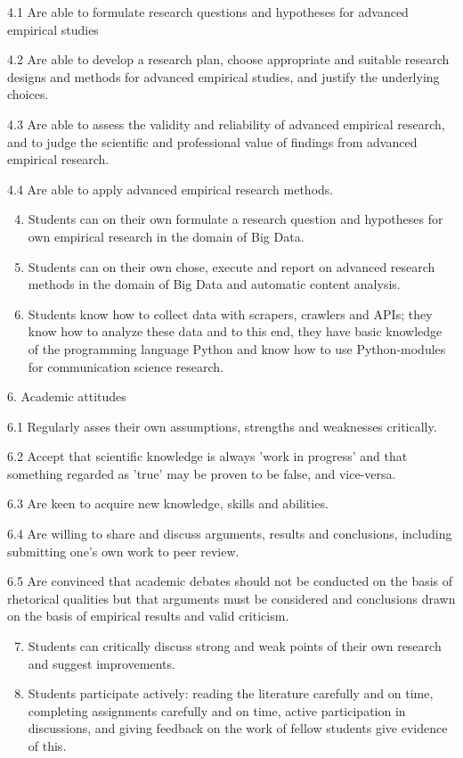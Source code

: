 \documentclass[a4paper,12pt]{report}
\begin{document}
{\footnotesize{
4.1	Are able to formulate research questions and hypotheses for advanced empirical studies


4.2	Are able to develop a research plan, choose appropriate and suitable research designs and methods for advanced empirical studies, and justify the underlying choices. 


4.3	Are able to assess the validity and reliability of advanced empirical research, and to judge the scientific and professional value of findings from advanced empirical research.


4.4	Are able to apply advanced empirical research methods.

 }}

\begin{enumerate}[A]
\setcounter{enumi}{3}
\item Students can on their own formulate a research question and hypotheses for own empirical research in the domain of Big Data.
\item Students can on their own chose, execute and report on advanced research methods in the domain of Big Data and automatic content analysis.
\item Students know how to collect data with scrapers, crawlers and APIs; they know how to analyze these data and to this end, they have basic knowledge of the programming language Python and know how to use Python-modules for communication science research.
\end{enumerate}


{\footnotesize{
6. Academic attitudes

6.1 	Regularly asses their own assumptions, strengths and weaknesses critically.


6.2	Accept that scientific knowledge is always 'work in progress' and that something
regarded as 'true' may be proven to be false, and vice-versa.


6.3 	Are keen to acquire new knowledge, skills and abilities. 


6.4 	Are willing to share and discuss arguments, results and conclusions, including submitting one's own work to peer review. 


6.5 	Are convinced that academic debates should not be conducted on the basis of rhetorical qualities but that arguments must be considered and conclusions drawn on the basis of empirical results and valid criticism.

 }}

\begin{enumerate}[A]
\setcounter{enumi}{6}
\item Students can critically discuss  strong and weak points of their own research and suggest improvements.
\item Students participate actively: reading the literature carefully and on time, completing assignments carefully and on time, active participation in discussions, and giving feedback on the work of fellow students give evidence of this.
\end{enumerate}
\end{document}
